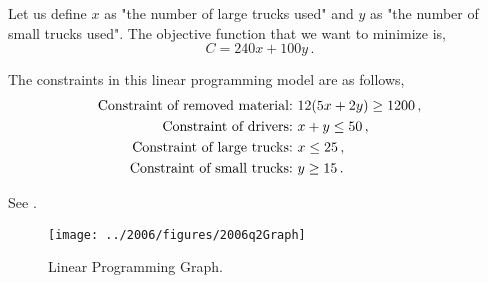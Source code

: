 %
%

\begin{subquestions}
	

\subquestion

Let us define $x$ as "the number of large trucks used" and $y$ as "the number of small trucks used". The objective function that we want to minimize is,
\begin{equation}
	C = 240x + 100y \,.
\end{equation}

The constraints in this linear programming model are as follows,
\begin{align}
	\text{Constraint of removed material:} \ & 12(5x + 2y) \geq 1200 \,, \nonumber \\
	\text{Constraint of drivers:} \ & x + y \leq 50 \,, \nonumber \\
	\text{Constraint of large trucks:} \ & x \leq 25 \,, \nonumber \\
	\text{Constraint of small trucks:} \ & y \geq 15 \,. 
\end{align}


\subquestion

\begin{subsubquestions}

	
\subsubquestion

See . 

\begin{figure}[H]
	\begin{center}
		\texttt{[image: ../2006/figures/2006q2Graph]}
		\caption{\label{2006:q2:fig:Graph} Linear Programming Graph.}
	\end{center}
\end{figure}


\end{subsubquestions}
\end{subquestions}

